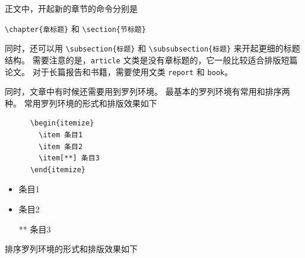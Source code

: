 正文中，开起新的章节的命令分别是
\begin{center}
  \verb|\chapter{章标题}| 和 \verb|\section{节标题}|
\end{center}
同时，还可以用
\verb|\subsection{标题}| 和 \verb|\subsubsection{标题}|
来开起更细的标题结构。
需要注意的是，\texttt{article} 文类是没有章标题的，它一般比较适合排版短篇论文。
对于长篇报告和书籍，需要使用文类 \texttt{report} 和 \texttt{book}。

同时，文章中有时候还需要用到罗列环境。
最基本的罗列环境有常用和排序两种。
常用罗列环境的形式和排版效果如下

\vspace{1.2em}
\begin{minipage}{0.5\textwidth}
\small
\begin{verbatim}
      \begin{itemize}
        \item 条目1
        \item 条目2
        \item[**] 条目3
      \end{itemize}
\end{verbatim}
\end{minipage}\qquad\begin{minipage}{0.3\textwidth}
\begin{itemize}
  \item 条目1
  \item 条目2
  \item[**] 条目3
\end{itemize}
\end{minipage}

\vspace{1.2em}\noindent
排序罗列环境的形式和排版效果如下

